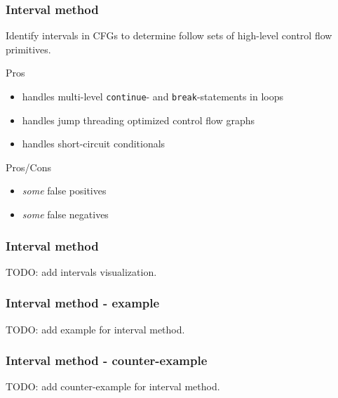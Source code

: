 \documentclass[aspectratio=1610]{beamer}
\begin{document}

\begin{frame}
	\frametitle{Interval method}

	Identify intervals in CFGs to determine follow sets of high-level control flow primitives.

	\vspace*{2em}

	\begin{block}{Pros}
		\begin{itemize}
			\item handles multi-level \texttt{continue}- and \texttt{break}-statements in loops
			\item handles jump threading optimized control flow graphs
			\item handles short-circuit conditionals
		\end{itemize}
	\end{block}

	\begin{block}{Pros/Cons}
		\begin{itemize}
			\item \textit{some} false positives
			\item \textit{some} false negatives
		\end{itemize}
	\end{block}


\end{frame}

\begin{frame}
	\frametitle{Interval method}
	TODO: add intervals visualization.
\end{frame}


\begin{frame}
	\frametitle{Interval method - example}

	TODO: add example for interval method.
\end{frame}

\begin{frame}
	\frametitle{Interval method - counter-example}

	TODO: add counter-example for interval method.

\end{frame}
\end{document}
